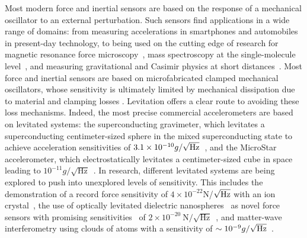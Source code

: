 \documentclass[twocolumn,superscriptaddress,floatfix,preprintnumbers,prl]{revtex4}
\begin{document}
\maketitle

Most modern force and inertial sensors are based on the response of a mechanical oscillator to an external perturbation. Such sensors find applications in a wide range of domains: from measuring accelerations in smartphones and automobiles~\cite{Bogue2013} in present-day technology, to being used on the cutting edge of research for magnetic resonance force microscopy~\cite{Rugar2004,Degen2009, bachtold2013}, mass spectroscopy at the single-molecule level~\cite{Naik2009}, and measuring gravitational and Casimir physics at short distances~\cite{Geraci2008,Geraci2010,ArkaniHamed1998,BookCasimir,Klimchitskaya2009}. Most force and inertial sensors are based on microfabricated clamped mechanical oscillators, whose sensitivity is ultimately limited by mechanical dissipation due to material and clamping losses \cite{imboden_dissipation_2014}. Levitation offers a clear route to avoiding these loss mechanisms. Indeed, the most precise commercial accelerometers are based on levitated systems: the superconducting gravimeter, which levitates a superconducting centimeter-sized sphere in the mixed superconducting state to achieve acceleration sensitivities of $3.1\times10^{-10} g/\sqrt{\rm Hz}$~\cite{goodkind1999}, and the MicroStar accelerometer, which electrostatically levitates a centimeter-sized cube in space leading to $10^{-11} g/\sqrt{\text{Hz}}$~\cite{christophe2015}. In research, different levitated systems are being explored to push into unexplored levels of sensitivity. This includes the demonstration of a record force sensitivity of $4\times10^{-22}$N/$\sqrt{\rm Hz}$ with an ion crystal~\cite{Biercuk2010}, the use of optically levitated dielectric nanospheres~\cite{ORI2010, Chang2010, Barker2010,Raizen2010,Gieseler2012,Kiesel2013,Millen2015} as novel force sensors with promising sensitivities~\cite{Yin2013,Rodenburg2016,Ranjit2016} of $2\times 10^{-20}~\text{N}/\sqrt{\text{Hz}}$~\cite{Gieseler2013}, and matter-wave interferometry using clouds of atoms with a sensitivity of $\sim10^{-9} g/\sqrt{\rm Hz}$~\cite{Hu2013, Abend2016}. 
\end{document}
